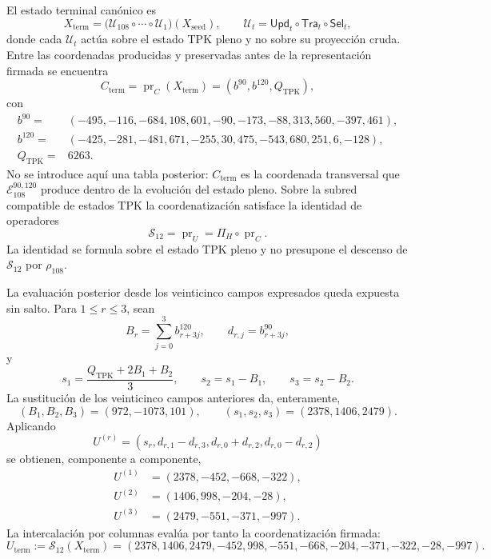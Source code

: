 El estado terminal canónico es
\[
 X_{\mathrm{term}}
 =\bigl(\mathcal U_{108}\circ\cdots\circ\mathcal U_1\bigr)
   (X_{\mathrm{seed}}),
 \qquad
 \mathcal U_t=\mathsf{Upd}_t\circ\mathsf{Tra}_t\circ\mathsf{Sel}_t,
\]
donde cada \(\mathcal U_t\) actúa sobre el estado TPK pleno y no sobre su
proyección cruda. Entre las coordenadas producidas y preservadas antes de la
representación firmada se encuentra
\[
 C_{\mathrm{term}}=\operatorname{pr}_{C}(X_{\mathrm{term}})
 =(b^{90},b^{120},Q_{\mathrm{TPK}}),
\]
con
\begin{align*}
 b^{90}={}&(-495,-116,-684,108,601,-90,
              -173,-88,313,560,-397,461),\\
 b^{120}={}&(-425,-281,-481,671,-255,30,
               475,-543,680,251,6,-128),\\
 Q_{\mathrm{TPK}}={}&6263.
\end{align*}
No se introduce aquí una tabla posterior: \(C_{\mathrm{term}}\) es la
coordenada transversal que \(\mathcal E_{108}^{90,120}\) produce dentro de
la evolución del estado pleno. Sobre la subred compatible de estados TPK la
coordenatización satisface la identidad de operadores
\begin{equation}
 \mathcal S_{12}=\operatorname{pr}_{U}
 =\Pi_H\circ\operatorname{pr}_{C}.
 \label{eq:registro-identidad-s12-pih}
\end{equation}
La identidad se formula sobre el estado TPK pleno y no presupone el descenso
de \(\mathcal S_{12}\) por \(\rho_{108}\).

La evaluación posterior desde los veinticinco campos expresados queda
expuesta sin salto. Para \(1\le r\le3\),
sean
\[
 B_r=\sum_{j=0}^{3}b^{120}_{r+3j},\qquad
 d_{r,j}=b^{90}_{r+3j},
\]
y
\[
 s_1=\frac{Q_{\mathrm{TPK}}+2B_1+B_2}{3},\qquad
 s_2=s_1-B_1,\qquad s_3=s_2-B_2.
\]
La sustitución de los veinticinco campos anteriores da, enteramente,
\[
 (B_1,B_2,B_3)=(972,-1073,101),\qquad
 (s_1,s_2,s_3)=(2378,1406,2479).
\]
Aplicando
\[
 U^{(r)}=(s_r,d_{r,1}-d_{r,3},d_{r,0}+d_{r,2},d_{r,0}-d_{r,2})
\]
se obtienen, componente a componente,
\begin{align*}
 U^{(1)}&=(2378,-452,-668,-322),\\
 U^{(2)}&=(1406,998,-204,-28),\\
 U^{(3)}&=(2479,-551,-371,-997).
\end{align*}
La intercalación por columnas evalúa por tanto la coordenatización firmada:
\begin{equation}
 U_{\mathrm{term}}:=\mathcal S_{12}(X_{\mathrm{term}})
 =(2378,1406,2479,-452,998,-551,-668,-204,-371,-322,-28,-997).
 \label{eq:registro-uterm-desde-estado-pleno}
\end{equation}

